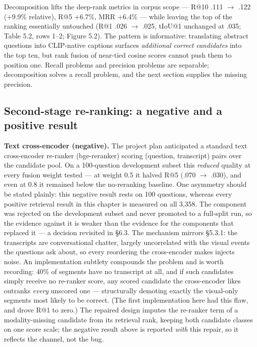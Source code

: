 Decomposition lifts the deep-rank metrics in corpus scope --- R@10 .111
\ensuremath{\rightarrow} .122 (+9.9\% relative), R@5 +6.7\%, MRR +6.4\%
--- while leaving the top of the ranking essentially untouched (R@1 .026
\ensuremath{\rightarrow} .025, tIoU@1 unchanged at .035; Table 5.2, rows
1--2; Figure 5.2). The pattern is informative: translating abstract
questions into CLIP-native captions surfaces \emph{additional correct
candidates} into the top ten, but rank fusion of near-tied cosine scores
cannot push them to position one. Recall problems and precision problems
are separable; decomposition solves a recall problem, and the next
section supplies the missing precision.

\subsection{Second-stage re-ranking: a negative and a positive
result}

\textbf{Text cross-encoder (negative).} The project plan anticipated a
standard text cross-encoder re-ranker (bge-reranker) scoring (question,
transcript) pairs over the candidate pool. On a 100-question development
subset this \emph{reduced} quality at every fusion weight tested --- at
weight 0.5 it halved R@5 (.070 \ensuremath{\rightarrow} .030), and even
at 0.8 it remained below the no-reranking baseline. One asymmetry should
be stated plainly: this negative result rests on 100 questions, whereas
every positive retrieval result in this chapter is measured on all
3,358. The component was rejected on the development subset and never
promoted to a full-split run, so the evidence against it is weaker than
the evidence for the components that replaced it --- a decision
revisited in §6.3. The mechanism mirrors §5.3.1: the transcripts are
conversational chatter, largely uncorrelated with the visual events the
questions ask about, so every reordering the cross-encoder makes injects
noise. An implementation subtlety compounds the problem and is worth
recording: 40\% of segments have no transcript at all, and if such
candidates simply receive no re-ranker score, any scored candidate the
cross-encoder likes outranks \emph{every} unscored one --- structurally
demoting exactly the visual-only segments most likely to be correct.
(The first implementation here had this flaw, and drove R@1 to zero.)
The repaired design imputes the re-ranker term of a modality-missing
candidate from its retrieval rank, keeping both candidate classes on one
score scale; the negative result above is reported \emph{with} this
repair, so it reflects the channel, not the bug.

